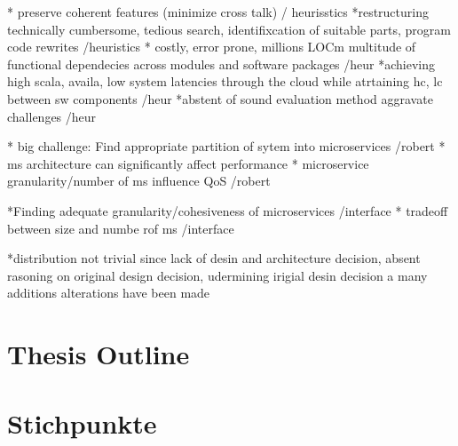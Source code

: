 * preserve coherent features (minimize cross talk) / heurisstics
*restructuring technically cumbersome, tedious search, identifixcation of suitable parts, program code rewrites /heuristics
* costly, error prone, millions LOCm multitude of functional dependecies across modules and software packages /heur
*achieving high scala, availa, low system latencies through the cloud while atrtaining hc, lc between sw  components /heur
*abstent of sound evaluation method aggravate challenges /heur

* big challenge: Find appropriate partition of sytem into microservices /robert
* ms architecture can significantly affect performance
* microservice granularity/number of ms influence QoS /robert

*Finding adequate granularity/cohesiveness of microservices /interface
* tradeoff between size and numbe rof ms /interface


*distribution not trivial since lack of desin and architecture decision, absent rasoning on original design decision, udermining irigial desin decision a many additions alterations have been made

\section{Thesis Outline}
\label{sec_Introduction:ThesisOutline}













\section{Stichpunkte}

